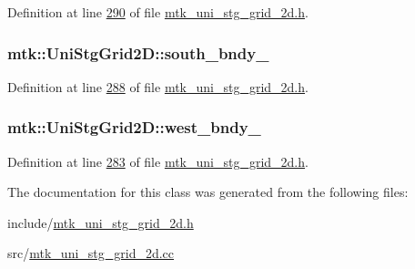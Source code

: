 Definition at line \hyperlink{mtk__uni__stg__grid__2d_8h_source_l00290}{290} of file \hyperlink{mtk__uni__stg__grid__2d_8h_source}{mtk\+\_\+uni\+\_\+stg\+\_\+grid\+\_\+2d.\+h}.

\hypertarget{classmtk_1_1UniStgGrid2D_ac228c81fad7f4feeae93fb3c09d7e175}{
\subsubsection[{south\+\_\+bndy\+\_\+}]{ mtk\+::\+Uni\+Stg\+Grid2\+D\+::south\+\_\+bndy\+\_\+\hspace{0.3cm}{\ttfamily [private]}}}\label{classmtk_1_1UniStgGrid2D_ac228c81fad7f4feeae93fb3c09d7e175}


Definition at line \hyperlink{mtk__uni__stg__grid__2d_8h_source_l00288}{288} of file \hyperlink{mtk__uni__stg__grid__2d_8h_source}{mtk\+\_\+uni\+\_\+stg\+\_\+grid\+\_\+2d.\+h}.

\hypertarget{classmtk_1_1UniStgGrid2D_a59c42d8099a017bc8a082fddc1e5606c}{
\subsubsection[{west\+\_\+bndy\+\_\+}]{ mtk\+::\+Uni\+Stg\+Grid2\+D\+::west\+\_\+bndy\+\_\+\hspace{0.3cm}{\ttfamily [private]}}}\label{classmtk_1_1UniStgGrid2D_a59c42d8099a017bc8a082fddc1e5606c}


Definition at line \hyperlink{mtk__uni__stg__grid__2d_8h_source_l00283}{283} of file \hyperlink{mtk__uni__stg__grid__2d_8h_source}{mtk\+\_\+uni\+\_\+stg\+\_\+grid\+\_\+2d.\+h}.



The documentation for this class was generated from the following files\+:\begin{DoxyCompactItemize}
\item 
include/\hyperlink{mtk__uni__stg__grid__2d_8h}{mtk\+\_\+uni\+\_\+stg\+\_\+grid\+\_\+2d.\+h}\item 
src/\hyperlink{mtk__uni__stg__grid__2d_8cc}{mtk\+\_\+uni\+\_\+stg\+\_\+grid\+\_\+2d.\+cc}\end{DoxyCompactItemize}
